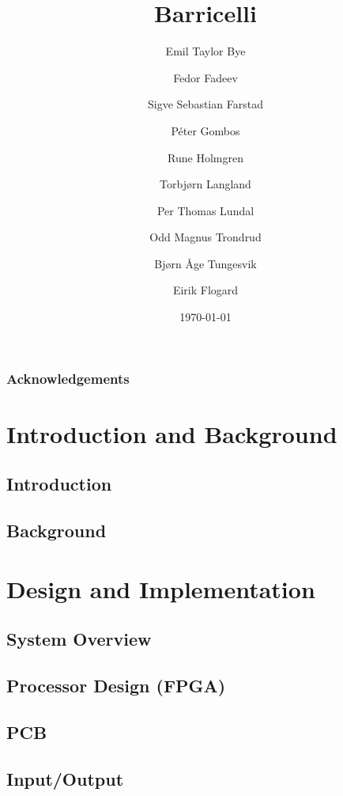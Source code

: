 \documentclass{report}
\title{Barricelli}
\date{\today}
\author{Emil Taylor Bye
     \and Fedor Fadeev
     \and Sigve Sebastian Farstad
     \and Péter Gombos
     \and Rune Holmgren
     \and Torbjørn Langland
     \and Per Thomas Lundal
     \and Odd Magnus Trondrud
     \and Bjørn Åge Tungesvik
     \and Eirik Flogard
}
\begin{document}


\maketitle

\begin{abstract}
	
\end{abstract}


\tableofcontents

\section{Acknowledgements}

\part{Introduction and Background}

\chapter{Introduction}
	

\chapter{Background}
	

\part{Design and Implementation}

\chapter{System Overview}
    

\chapter{Processor Design (FPGA)}
	

\chapter{PCB}
	

\chapter{Input/Output}
	
\end{document}
